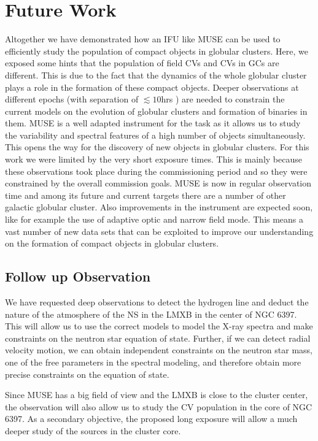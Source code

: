 \chapter{Future Work}\label{chap:future}
\thispagestyle{fancy}


Altogether we have demonstrated how an IFU like MUSE can be used to efficiently study the population of compact objects in globular clusters. Here, we exposed some hints that the population of field CVs and CVs in  GCs are different. This is due to the fact that the dynamics of the whole globular cluster plays a role in the formation of these compact objects. Deeper observations at different epochs (with separation of $\lesssim 10 $hrs ) are needed to constrain the current models on the evolution of globular clusters and formation of binaries in them. MUSE is a well adapted instrument for the task as it allows us to study the variability and spectral features of a high number of objects simultaneously. This opens the way for the discovery of new objects in globular clusters. For this work we were limited by the very short exposure times. This is mainly because these observations took place during the commissioning period and so they were constrained by the overall commission goals. MUSE is now in regular observation time and among its future and current targets there are a number of other galactic globular cluster. Also improvements in the instrument are expected soon, like for example the use of adaptive optic and narrow field mode. This means  a vast number of new data sets that can be exploited to improve our understanding on the formation of compact objects in globular clusters. 

\section{Follow up Observation}

We have requested deep observations to detect the hydrogen line and deduct the nature of the atmosphere of the NS in the LMXB in the center of NGC 6397. This will allow us to use the correct models to model the X-ray spectra and make constraints on the neutron star equation of state. Further, if we can detect radial velocity motion, we can obtain independent constraints on the neutron star mass, one of the free parameters in the spectral modeling, and therefore obtain more precise constraints on the equation of state. 


 Since MUSE has a big field of view and the LMXB is close to the cluster center, the observation will also allow us to study the CV population in the core of NGC 6397. As a secondary objective, the proposed long exposure will allow a much deeper study of the sources in the cluster core. 
 
